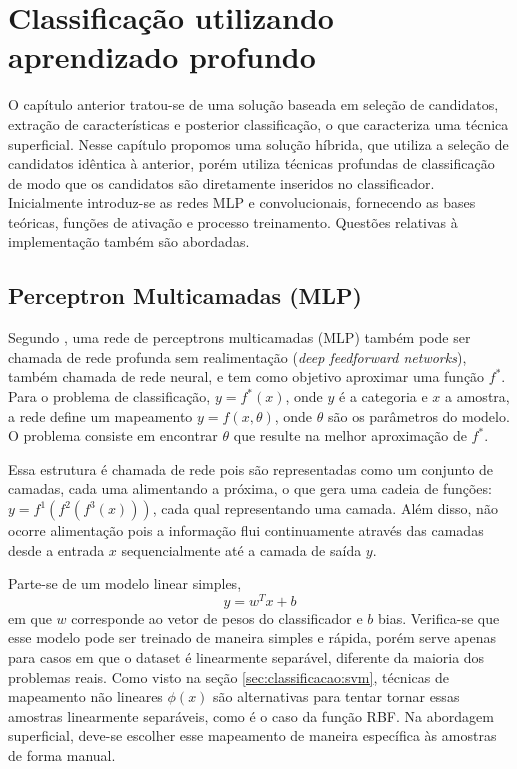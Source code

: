 \chapter{Classificação utilizando aprendizado profundo}

O capítulo anterior tratou-se de uma solução baseada em seleção de candidatos, extração de características e posterior classificação, o que caracteriza uma técnica superficial. Nesse capítulo propomos uma solução híbrida, que utiliza a seleção de candidatos idêntica à anterior, porém utiliza técnicas profundas de classificação de modo que os candidatos são diretamente inseridos no classificador. Inicialmente introduz-se as redes MLP e convolucionais, fornecendo as bases teóricas, funções de ativação e processo treinamento.  Questões relativas à implementação também são abordadas.

\section{Perceptron Multicamadas (MLP)}

Segundo \cite{DLbook}, uma rede de perceptrons multicamadas (MLP) também pode ser chamada de rede profunda sem realimentação (\textit{deep feedforward networks}), também chamada de rede neural, e tem como objetivo aproximar uma função $f^*$. Para o problema de classificação, $y=f^*(x)$, onde $y$ é a categoria e $x$ a amostra, a rede define um mapeamento $y = f(x,\theta)$, onde $\theta$ são os parâmetros do modelo. O problema consiste em encontrar $\theta$ que resulte na melhor aproximação de $f^*$.

Essa estrutura é chamada de rede pois são representadas como um conjunto de camadas, cada uma alimentando a próxima, o que gera uma cadeia de funções: $y=f^1(f^2(f^3(x)))$, cada qual representando uma camada. Além disso, não ocorre alimentação pois a informação flui continuamente através das camadas desde a entrada $x$ sequencialmente até a camada de saída $y$.

Parte-se de um modelo linear simples,
\begin{equation}
y=w^Tx+b
\end{equation}
em que $w$ corresponde ao vetor de pesos do classificador e $b$ bias. Verifica-se que esse modelo pode ser treinado de maneira simples e rápida, porém serve apenas para casos em que o dataset é linearmente separável, diferente da maioria dos problemas reais. Como visto na seção \ref{sec:classificacao:svm}, técnicas de mapeamento não lineares $\phi(x)$ são alternativas para tentar tornar essas amostras linearmente separáveis, como é o caso da função RBF. Na abordagem superficial, deve-se escolher esse mapeamento de maneira específica às amostras de forma manual. 

